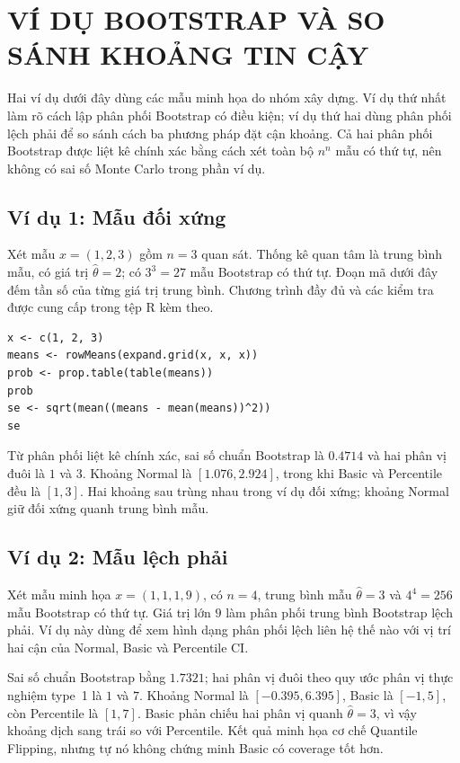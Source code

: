 \documentclass[12pt,a4paper]{article}
\theoremstyle{definition}
\numberwithin{equation}{section}
\begin{document}
\newpage
\section{VÍ DỤ BOOTSTRAP VÀ SO SÁNH KHOẢNG TIN CẬY}
\label{sec:examples}

Hai ví dụ dưới đây dùng các mẫu minh họa do nhóm xây dựng. Ví dụ thứ nhất
làm rõ cách lập phân phối Bootstrap có điều kiện; ví dụ thứ hai dùng phân
phối lệch phải để so sánh cách ba phương pháp đặt cận khoảng. Cả hai phân
phối Bootstrap được liệt kê chính xác bằng cách xét toàn bộ $n^n$ mẫu có
thứ tự, nên không có sai số Monte Carlo trong phần ví dụ.

\subsection{Ví dụ 1: Mẫu đối xứng}

Xét mẫu $x=(1,2,3)$ gồm $n=3$ quan sát. Thống kê quan tâm là trung bình mẫu, có giá trị $\hat\theta=2$; có $3^3=27$ mẫu Bootstrap có thứ tự. Đoạn mã dưới đây đếm tần số của từng giá trị trung bình. Chương trình đầy đủ và các kiểm tra được cung cấp trong tệp R kèm theo.



\begin{lstlisting}[style=Rstyle, caption={Bootstrap đối xứng}]
x <- c(1, 2, 3)
means <- rowMeans(expand.grid(x, x, x))
prob <- prop.table(table(means))
prob
se <- sqrt(mean((means - mean(means))^2))
se
\end{lstlisting}

Từ phân phối liệt kê chính xác, sai số chuẩn Bootstrap là $0.4714$ và hai
phân vị đuôi là $1$ và $3$. Khoảng Normal là $[1.076,2.924]$, trong khi
Basic và Percentile đều là $[1,3]$. Hai khoảng sau trùng nhau trong ví dụ
đối xứng; khoảng Normal giữ đối xứng quanh trung bình mẫu.

\subsection{Ví dụ 2: Mẫu lệch phải}
\label{sec:example-skewed}

Xét mẫu minh họa $x=(1,1,1,9)$, có $n=4$, trung bình mẫu $\hat\theta=3$
và $4^4=256$ mẫu Bootstrap có thứ tự. Giá trị lớn $9$ làm phân phối trung
bình Bootstrap lệch phải. Ví dụ này dùng để xem hình dạng phân phối lệch
liên hệ thế nào với vị trí hai cận của Normal, Basic và Percentile CI.

Sai số chuẩn Bootstrap bằng $1.7321$; hai phân vị đuôi theo quy ước phân vị
thực nghiệm type~1 là $1$ và $7$. Khoảng Normal là
$[-0.395,6.395]$, Basic là $[-1,5]$, còn Percentile là $[1,7]$. Basic phản
chiếu hai phân vị quanh $\hat\theta=3$, vì vậy khoảng dịch sang trái so
với Percentile. Kết quả minh họa cơ chế Quantile Flipping, nhưng tự nó
không chứng minh Basic có coverage tốt hơn.
\end{document}
